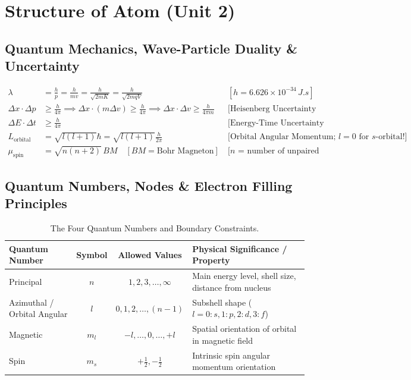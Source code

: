 \documentclass[11pt,a4paper]{article}
\begin{document}
\newpage

\section{Structure of Atom (Unit 2)}

\subsection{Quantum Mechanics, Wave-Particle Duality \& Uncertainty}

\begin{formulabox}
\begin{align}
  \lambda &= \frac{h}{p} = \frac{h}{mv} = \frac{h}{\sqrt{2mK}} = \frac{h}{\sqrt{2mqV}} && [h = 6.626\times 10^{-34}\,\si{J.s}] \\
  \Delta x \cdot \Delta p &\ge \frac{h}{4\pi} \implies \Delta x \cdot (m\Delta v) \ge \frac{h}{4\pi} \implies \Delta x \cdot \Delta v \ge \frac{h}{4\pi m} && \text{[Heisenberg Uncertainty Principle]} \\
  \Delta E \cdot \Delta t &\ge \frac{h}{4\pi} && \text{[Energy-Time Uncertainty Formulation]} \\
  L_{\text{orbital}} &= \sqrt{l(l + 1)}\hbar = \sqrt{l(l + 1)}\frac{h}{2\pi} && \text{[Orbital Angular Momentum; $l=0$ for $s$-orbital!]} \\
  \mu_{\text{spin}} &= \sqrt{n(n + 2)}\,\si{BM} \quad [\si{BM} = \text{Bohr Magneton}] && \text{[$n$ = number of unpaired electrons]}
\end{align}
\end{formulabox}

\subsection{Quantum Numbers, Nodes \& Electron Filling Principles}

\begin{table}[htbp]
\centering
\small
\renewcommand{\arraystretch}{1.2}
\begin{tabularx}{\textwidth}{L c c L}
\toprule
\textbf{Quantum Number} & \textbf{Symbol} & \textbf{Allowed Values} & \textbf{Physical Significance / Property} \\
\midrule
Principal & $n$ & $1, 2, 3, \dots, \infty$ & Main energy level, shell size, distance from nucleus \\
Azimuthal / Orbital Angular & $l$ & $0, 1, 2, \dots, (n - 1)$ & Subshell shape ($l=0: s, 1: p, 2: d, 3: f$) \\
Magnetic & $m_l$ & $-l, \dots, 0, \dots, +l$ & Spatial orientation of orbital in magnetic field \\
Spin & $m_s$ & $+\frac{1}{2}, -\frac{1}{2}$ & Intrinsic spin angular momentum orientation \\
\bottomrule
\end{tabularx}
\caption{The Four Quantum Numbers and Boundary Constraints.}
\end{table}
\end{document}
